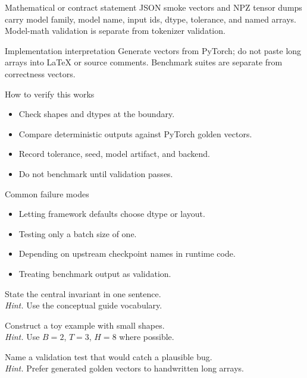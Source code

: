 \begin{definitionbox}{Mathematical or contract statement}
JSON smoke vectors and NPZ tensor dumps carry model family, model name, input ids, dtype, tolerance, and named arrays. Model-math validation is separate from tokenizer validation.
\end{definitionbox}

\begin{implementationbox}{Implementation interpretation}
Generate vectors from PyTorch; do not paste long arrays into LaTeX or source comments. Benchmark suites are separate from correctness vectors.
\end{implementationbox}

\begin{verificationbox}{How to verify this works}
\begin{itemize}
\item Check shapes and dtypes at the boundary.
\item Compare deterministic outputs against PyTorch golden vectors.
\item Record tolerance, seed, model artifact, and backend.
\item Do not benchmark until validation passes.
\end{itemize}
\end{verificationbox}

\begin{warningbox}{Common failure modes}
\begin{itemize}
\item Letting framework defaults choose dtype or layout.
\item Testing only a batch size of one.
\item Depending on upstream checkpoint names in runtime code.
\item Treating benchmark output as validation.
\end{itemize}
\end{warningbox}

\begin{chapterexercises}
\item State the central invariant in one sentence.\\
\textit{Hint.} Use the conceptual guide vocabulary.
\item Construct a toy example with small shapes.\\
\textit{Hint.} Use $B=2$, $T=3$, $H=8$ where possible.
\item Name a validation test that would catch a plausible bug.\\
\textit{Hint.} Prefer generated golden vectors to handwritten long arrays.
\end{chapterexercises}
